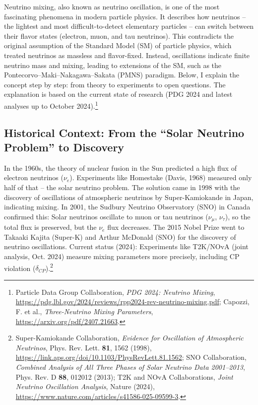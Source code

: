 	Neutrino mixing, also known as neutrino oscillation, is one of the most fascinating phenomena in modern particle physics. It describes how neutrinos -- the lightest and most difficult-to-detect elementary particles -- can switch between their flavor states (electron, muon, and tau neutrinos). This contradicts the original assumption of the Standard Model (SM) of particle physics, which treated neutrinos as massless and flavor-fixed. Instead, oscillations indicate finite neutrino mass and mixing, leading to extensions of the SM, such as the Pontecorvo--Maki--Nakagawa--Sakata (PMNS) paradigm. Below, I explain the concept step by step: from theory to experiments to open questions. The explanation is based on the current state of research (PDG 2024 and latest analyses up to October 2024).\footnote{Particle Data Group Collaboration, \emph{PDG 2024: Neutrino Mixing}, \url{https://pdg.lbl.gov/2024/reviews/rpp2024-rev-neutrino-mixing.pdf}; Capozzi, F. et al., \emph{Three-Neutrino Mixing Parameters}, \url{https://arxiv.org/pdf/2407.21663}.}
	
	\subsection{Historical Context: From the ``Solar Neutrino Problem'' to Discovery}
	
	In the 1960s, the theory of nuclear fusion in the Sun predicted a high flux of electron neutrinos ($\nu_e$). Experiments like Homestake (Davis, 1968) measured only half of that -- the solar neutrino problem. The solution came in 1998 with the discovery of oscillations of atmospheric neutrinos by Super-Kamiokande in Japan, indicating mixing. In 2001, the Sudbury Neutrino Observatory (SNO) in Canada confirmed this: Solar neutrinos oscillate to muon or tau neutrinos ($\nu_\mu$, $\nu_\tau$), so the total flux is preserved, but the $\nu_e$ flux decreases. The 2015 Nobel Prize went to Takaaki Kajita (Super-K) and Arthur McDonald (SNO) for the discovery of neutrino oscillations. Current status (2024): Experiments like T2K/NOvA (joint analysis, Oct. 2024) measure mixing parameters more precisely, including CP violation ($\delta_{CP}$).\footnote{Super-Kamiokande Collaboration, \emph{Evidence for Oscillation of Atmospheric Neutrinos}, Phys. Rev. Lett. \textbf{81}, 1562 (1998), \url{https://link.aps.org/doi/10.1103/PhysRevLett.81.1562}; SNO Collaboration, \emph{Combined Analysis of All Three Phases of Solar Neutrino Data 2001--2013}, Phys. Rev. D \textbf{88}, 012012 (2013); T2K and NOvA Collaborations, \emph{Joint Neutrino Oscillation Analysis}, Nature (2024), \url{https://www.nature.com/articles/s41586-025-09599-3}.}
	
